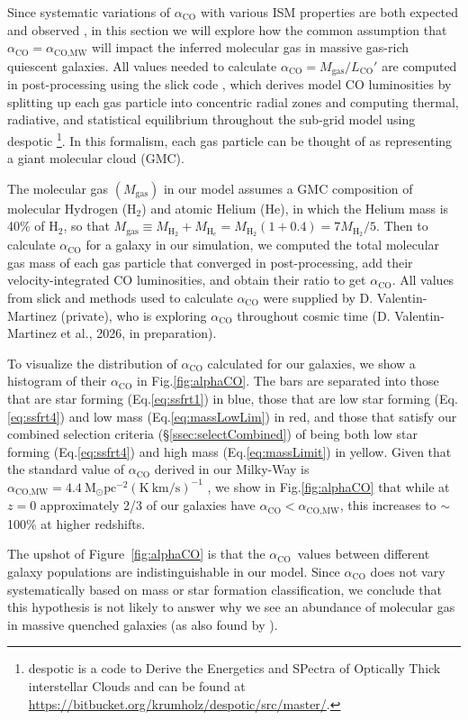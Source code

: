 \documentclass[twocolumn, linenumbers]{aastex631}
\newcommand{\mhh}{M_{\text{H}_2}}
\newcommand{\mgas}{M_{\text{gas}}}
\newcommand{\eq}{Eq.\hspace{.2em}}
\renewcommand{\fig}{Fig.\hspace{.2em}}
\newcommand{\slick}[0]{{\sc slick} }
\newcommand{\despotic}[0]{{\sc despotic} }
\newcommand{\aco}{\alpha_\text{CO}}
\newcommand{\acomw}{\alpha_{\text{CO,MW}}}
\begin{document}
Since systematic variations of $\aco$ with various ISM properties are both expected and observed \citep{Strong04,narayanan12, Sandstrom13}, in this section we will explore how the common assumption that $\aco=\acomw$ will impact the inferred molecular gas in massive gas-rich quiescent galaxies.  All values needed to calculate $\aco=\mgas/L_{\text{CO}}'$ are computed in post-processing using the \slick code \citep{slick}, which derives model CO luminosities by splitting up each gas particle into concentric radial zones \citep{popping} and computing thermal, radiative, and statistical equilibrium throughout the sub-grid model using \despotic\!\!\footnote{\despotic is a code to Derive the Energetics and SPectra of Optically Thick interstellar Clouds and can be found at \url{https://bitbucket.org/krumholz/despotic/src/master/}.}\citep{despotic}.  In this formalism, each gas particle can be thought of as representing a giant molecular cloud (GMC).  

The molecular gas $(\mgas)$ in our model assumes a GMC composition of molecular Hydrogen (H$_2$) and atomic Helium (He), in which the Helium mass is 40\% of H$_2$, so that $\mgas \equiv \mhh+M_{\text{H}_e}=\mhh(1+0.4)=7\mhh/5$.  Then to calculate $\aco$ for a galaxy in our simulation, we computed the total molecular gas mass of each gas particle that converged in post-processing, add their velocity-integrated CO luminosities, and obtain their ratio to get $\aco$.  All values from \slick and methods used to calculate $\aco$ were supplied by D. Valentin-Martinez (private), who is exploring $\aco$ throughout cosmic time (D. Valentin-Martinez et al., 2026, in preparation).

To visualize the distribution of $\aco$ calculated for our galaxies, we show a histogram of their $\aco$ in \fig \ref{fig:alphaCO}.  The bars are separated into those that are star forming (\eq \ref{eq:ssfrt1}) in blue, those that are low star forming (\eq \ref{eq:ssfrt4}) and low mass (\eq \ref{eq:massLowLim}) in red, and those that satisfy our combined selection criteria (\S\ref{ssec:selectCombined}) of being both low star forming (\eq \ref{eq:ssfrt4}) and high mass (\eq \ref{eq:massLimit}) in yellow.  Given that the standard value of $\aco$ derived in our Milky-Way is $\acomw=4.4\ \text{M}_\odot \text{pc}^{-2} (\text{K}~\text{km/s})^{-1}$ \citep{Bolatto_2013}, we show in \fig\ref{fig:alphaCO} that while at $z=0$ approximately 2/3 of our galaxies have $\aco<\acomw$, this increases to $\sim$100\% at higher redshifts.

The upshot of Figure~\ref{fig:alphaCO} is that the $\aco$\ values between different galaxy populations are indistinguishable in our model.  Since $\aco$ does not vary systematically based on mass or star formation classification, we conclude that this hypothesis is not likely to answer why we see an abundance of molecular gas in massive quenched galaxies (as also found by \citealt{setton2025}).
\end{document}
